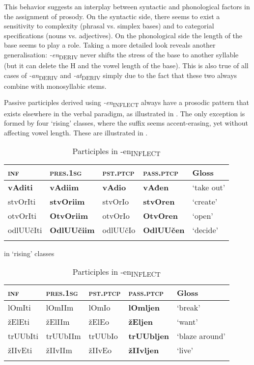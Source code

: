 \documentclass[output=paper]{langsci/langscibook}
\begin{document}
This behavior suggests an interplay between syntactic and phonological factors in the assignment of prosody. On the syntactic side, there seems to exist a sensitivity to complexity (phrasal vs. simplex bases) and to categorial specifications (nouns vs. adjectives). On the phonological side the length of the base seems to play a role. Taking a more detailed look reveals another generalisation: \textit{{-en}}\textsubscript{DERIV} never shifts the stress of the base to another syllable (but it can delete the H and the vowel length of the base). This is also true of all cases of \textit{{-an}}\textsubscript{DERIV} and
\textit{{-at}}\textsubscript{DERIV} simply due to the fact that these two always combine with monosyllabic stems.

Passive participles derived using \textit{{-en}}\textsubscript{INFLECT} always have a prosodic pattern that exists elsewhere in the verbal paradigm, as illustrated in . The only exception is formed by four `rising' classes, where the suffix seems accent-erasing, yet without affecting vowel length. These are illustrated in .

\begin{table}
\caption{Participles in {-en}\textsubscript{INFLECT}}
\label{tab10}
 \begin{tabular}{ l l l l l}
\lsptoprule  
\textsc{inf}&\textsc{pres.1sg}&\textsc{pst.ptcp}&\textsc{pass.ptcp}& Gloss
\\ 
\midrule
\textbf{vAditi} & \textbf{vAdiim} & \textbf{vAdio} & \textbf{vAđen} & `take out' \\
stvOrIti & \textbf{stvOriim} & stvOrIo & \textbf{stvOren} & `create' \\
otvOrIti & \textbf{OtvOriim} & otvOrIo & \textbf{OtvOren} & `open' \\
odlUUčIti & \textbf{OdlUUčiim} & odlUUčIo & \textbf{OdlUUčen} & `decide'
\\
\lspbottomrule
 \end{tabular}
\end{table}


\begin{table}
\caption{Participles in {-en}\textsubscript{INFLECT}} in `rising' classes
\label{tab11}
 \begin{tabular}{ l l l l l}
\lsptoprule  
\textsc{inf}&\textsc{pres.1sg}&\textsc{pst.ptcp}&\textsc{pass.ptcp}& Gloss
\\ 
\midrule
lOmIti & lOmIIm & lOmIo & \textbf{lOmljen} & `break' \\
žElEti & žElIIm & žElEo & \textbf{žEljen} & `want'\\
trUUbIti & trUUbIIm & trUUbIo & \textbf{trUUbljen} & `blaze around'  \\
žIIvEti & žIIvIIm & žIIvEo & \textbf{žIIvljen} & `live' 
\\
\lspbottomrule
 \end{tabular}
\end{table}
\end{document}

